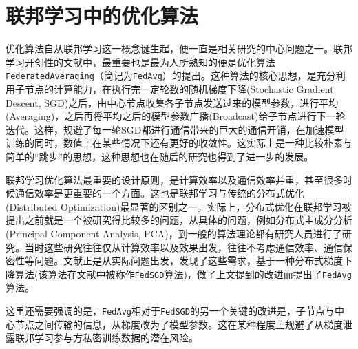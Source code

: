 \section{联邦学习中的优化算法}
\label{sec:chap2-overview}

优化算法自从联邦学习这一概念诞生起，便一直是相关研究的中心问题之一。联邦学习开创性的文献\parencite{mcmahan2017fed_avg}中，最重要也是最为人所熟知的便是优化算法\texttt{FederatedAveraging}（简记为\texttt{FedAvg}）的提出。这种算法的核心思想，是充分利用子节点的计算能力，在执行完一定轮数的随机梯度下降(Stochastic Gradient Descent, SGD)之后，由中心节点收集各子节点发送过来的模型参数，进行平均(Averaging)，之后再将平均之后的模型参数广播(Broadcast)给子节点进行下一轮迭代。这样，规避了每一轮SGD都进行通信带来的巨大的通信开销，在加速模型训练的同时，数值上在某些情况下还有更好的收敛性。这实际上是一种比较朴素与简单的``跳步''的思想，这种思想也在随后的研究\cite{zhang2020fedpd, proxskip, proxskip-vr}也得到了进一步的发展。

联邦学习优化算法最重要的设计原则，是计算效率以及通信效率并重，甚至很多时候通信效率是更重要的一个方面。这也是联邦学习与传统的分布式优化(Distributed Optimization)最显著的区别之一。实际上，分布式优化在联邦学习被提出之前就是一个被研究得比较多的问题，从具体的问题，例如分布式主成分分析(Principal Component Analysis, PCA)\cite{dist_pca_2014_nips}，到一般的算法理论\cite{boyd2011distributed}都有研究人员进行了研究。当时这些研究往往仅从计算效率以及效果出发，往往不考虑通信效率、通信保密性等问题。文献\parencite{mcmahan2017fed_avg}正是从实际问题出发，发现了这些需求，基于一种分布式梯度下降算法\cite{chen2016_revisit}(该算法在文献\parencite{mcmahan2017fed_avg}中被称作\texttt{FedSGD}算法)，做了上文提到的改进而提出了\texttt{FedAvg}算法。

这里还需要强调的是，\texttt{FedAvg}相对于\texttt{FedSGD}的另一个关键的改进是，子节点与中心节点之间传输的信息，从梯度改为了模型参数。这在某种程度上规避了从梯度泄露联邦学习参与方私密训练数据\cite{zhu2019deep_leakage}的潜在风险。

